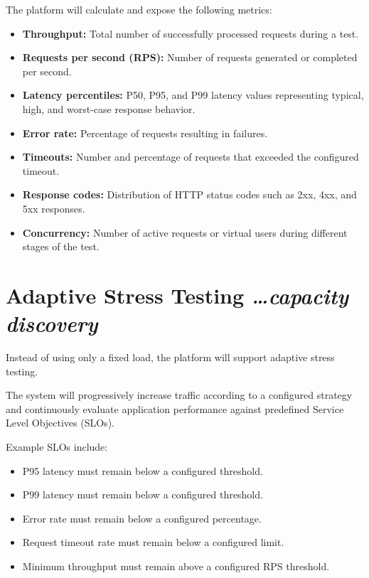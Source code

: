 \documentclass[11pt,a4paper]{article}
\newcommand{\BvrHint}[1]{%
  {\normalfont\normalsize\itshape\hfill #1}}
\begin{document}
The platform will calculate and expose the following metrics:

\begin{itemize}[leftmargin=0.7cm]

    \item \textbf{Throughput:} Total number of successfully processed
    requests during a test.

    \item \textbf{Requests per second (RPS):} Number of requests
    generated or completed per second.

    \item \textbf{Latency percentiles:} P50, P95, and P99 latency
    values representing typical, high, and worst-case response
    behavior.

    \item \textbf{Error rate:} Percentage of requests resulting in
    failures.

    \item \textbf{Timeouts:} Number and percentage of requests that
    exceeded the configured timeout.

    \item \textbf{Response codes:} Distribution of HTTP status codes
    such as 2xx, 4xx, and 5xx responses.

    \item \textbf{Concurrency:} Number of active requests or virtual
    users during different stages of the test.

\end{itemize}

\section{Adaptive Stress Testing%
  \BvrHint{\ldots capacity discovery}}

Instead of using only a fixed load, the platform will support
adaptive stress testing.

The system will progressively increase traffic according to a
configured strategy and continuously evaluate application performance
against predefined Service Level Objectives (SLOs).

Example SLOs include:

\begin{itemize}[leftmargin=0.7cm]

    \item P95 latency must remain below a configured threshold.

    \item P99 latency must remain below a configured threshold.

    \item Error rate must remain below a configured percentage.

    \item Request timeout rate must remain below a configured limit.

    \item Minimum throughput must remain above a configured RPS
    threshold.

\end{itemize}
\end{document}
